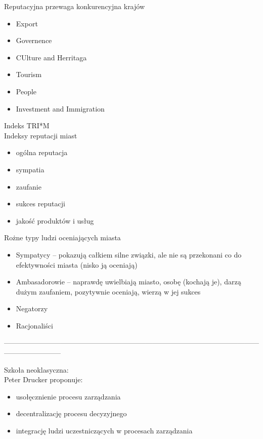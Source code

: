 \documentclass[a4paper,10pt]{report}
\begin{document}
Reputacyjna przewaga konkurencyjna krajów

\begin{itemize}
	\item Export
	\item Governence
	\item CUlture and Herritaga
	\item Tourism
	\item People
	\item Investment and Immigration
\end{itemize}

Indeks TRI*M\\
Indeksy reputacji miast\\
\begin{itemize}
	\item ogólna reputacja
	\item sympatia
	\item zaufanie
	\item sukces reputacji
	\item jakość produktów i usług
\end{itemize}

Rożne typy ludzi oceniających miasta
\begin{itemize}
	\item Sympatycy -- pokazują całkiem silne związki, ale nie są przekonani co do efektywności miasta (nisko ją oceniają)
	\item Ambasadorowie -- naprawdę uwielbiają miasto, osobę (kochają je), darzą dużym zaufaniem, pozytywnie oceniają, wierzą w jej sukces
	\item Negatorzy
	\item Racjonaliści
\end{itemize}

------------------------------------------------------------------------------------------------------------------------------------

Szkoła neoklasyczna:\\

Peter Drucker proponuje:
\begin{itemize}
	\item usołęcznienie procesu zarządzania
	\item decentralizację procesu decyzyjnego
	\item integrację ludzi uczestniczących w procesach zarządzania
\end{itemize}
\end{document}
